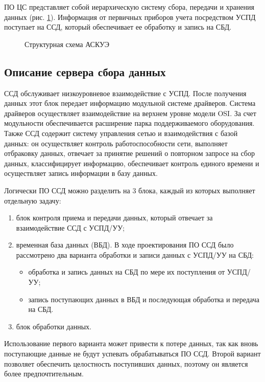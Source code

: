ПО ЦС представляет собой иерархическую систему сбора, передачи и хранения данных (рис. \ref{irsh:irsh}). Информация от первичных приборов учета посредством УСПД поступает на ССД, который обеспечивает ее обработку и запись на СБД.

\begin{figure}[h!]
 \caption{Структурная схема АСКУЭ}
 \label{irsh:irsh}
\end{figure}

\subsection{Описание сервера сбора данных}

ССД обслуживает низкоуровневое взаимодействие с УСПД. После получения данных этот блок передает информацию модульной системе драйверов. Система драйверов осуществляет взаимодействие на верхнем уровне модели OSI. За счет модульности обеспечивается расширение парка поддерживаемого оборудования. Также ССД содержит систему управления сетью и взаимодействия с базой данных: он осуществляет контроль работоспособности сети, выполняет отбраковку данных, отвечает за принятие решений о повторном запросе на сбор данных, классифицирует информацию, обеспечивает контроль единого времени и осуществляет запись информации в базу данных.

Логически ПО ССД можно разделить на 3 блока, каждый из которых выполняет отдельную задачу:
\begin{enumerate}
\item блок контроля приема и передачи данных, который отвечает за взаимодействие ССД с УСПД/УУ;
\item временная база данных (ВБД). В ходе проектирования ПО ССД было рассмотрено два варианта обработки и записи данных с УСПД/УУ на СБД: 
\begin{itemize}
\item обработка и запись данных на СБД по мере их поступления от УСПД/УУ;
\item запись поступающих данных в ВБД и последующая обработка и передача на СБД.
\end{itemize}
\item блок обработки данных.
\end{enumerate}

Использование первого варианта может привести к потере данных, так как вновь поступающие данные не будут успевать обрабатываться ПО ССД. Второй вариант позволяет обеспечить целостность поступивших данных, поэтому он является более предпочтительным.

